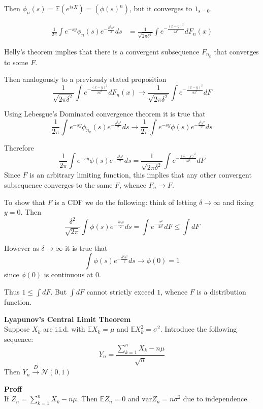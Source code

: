 \documentclass[a4paper]{article}
\newcommand{\brac}[1]{{\left ( #1 \right )}}
\newcommand{\Ex}{\mathbb{E}}
\begin{document}
Then $\phi_n(s) = \Ex\brac{e^{isX}} = \brac{\phi(s)^n}$, but it converges to $1_{s=0}$.


\begin{align*}
	\frac{1}{2\pi}\int e^{-sy} \phi_n(s) e^{-\frac{\delta^2 s^2}{2}}ds
	& = \frac{1}{\sqrt{2\pi\delta^2}}\int e^{-\frac{{(x-y)}^2}{2\delta^2}}dF_n(x)
\end{align*}

Helly's theorem implies that there is a convergent subsequence $F_{n_k}$ that converges to some $F$.

Then analogously to a previously stated proposition
\[\frac{1}{\sqrt{2\pi\delta^2}}\int e^{-\frac{{(x-y)}^2}{2\delta^2}}dF_n(x) \to \frac{1}{\sqrt{2\pi\delta^2}}\int e^{-\frac{{(x-y)}^2}{2\delta^2}}dF\]

Using Lebesgue's Dominated convergence theorem it is true that
\[\frac{1}{2\pi}\int e^{-sy} \phi_{n_k}(s) e^{-\frac{\delta^2 s^2}{2}}ds \to \frac{1}{2\pi}\int e^{-sy} \phi(s) e^{-\frac{\delta^2 s^2}{2}}ds\]

Therefore
\[\frac{1}{2\pi}\int e^{-sy} \phi(s) e^{-\frac{\delta^2 s^2}{2}}ds = \frac{1}{\sqrt{2\pi\delta^2}}\int e^{-\frac{{(x-y)}^2}{2\delta^2}}dF\]
Since $F$ is an arbitrary limiting function, this implies that any other convergent subsequence converges to the same $F$, whence $F_n\to F$.

To show that $F$ is a CDF we do the following: think of letting $\delta\to \infty$ and fixing $y=0$. Then
\[\frac{\delta^2}{\sqrt{2\pi}}\int \phi(s) e^{-\frac{\delta^2 s^2}{2}}ds = \int e^{-\frac{x^2}{2\delta^2}}dF \leq \int dF\]

However as $\delta\to\infty$ it is true that
\[\int \phi(s) e^{-\frac{\delta^2 s^2}{2}}ds\to \phi(0) = 1\]
since $\phi(0)$ is continuous at $0$.

Thus $1 \leq \int dF$. But $\int dF$ cannot strictly exceed $1$, whence $F$ is a distribution function.

\noindent\textbf{Lyapunov's Central Limit Theorem} \hfill\\
Suppose $X_k$ are i.i.d. with $\Ex X_k = \mu$ and $\Ex X_k^2 = \sigma^2$. Introduce the following sequence:
\[Y_n = \frac{\sum_{k=1}^n X_k - n \mu }{\sqrt{n}}\]
Then $Y_n\overset{D}{\to}\mathcal{N}(0,1)$

\textbf{Proff}\hfill\\

If $Z_n = \sum_{k=1}^n X_k - n\mu$. Then $\Ex Z_n = 0$ and $\text{var} Z_n = n \sigma^2$ due to independence.
\end{document}

